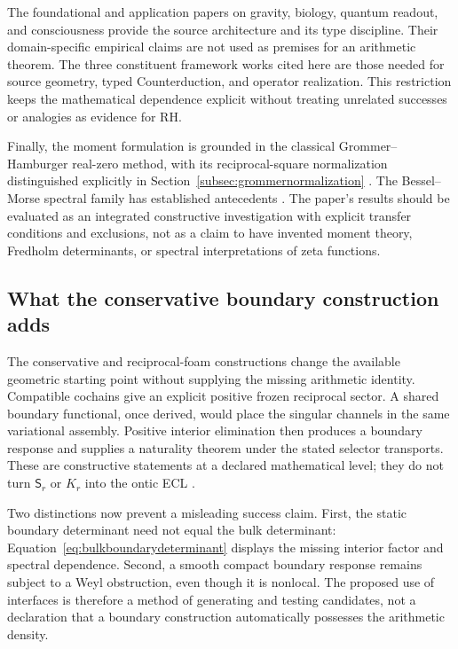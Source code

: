 \documentclass[11pt,letterpaper]{article}
\numberwithin{equation}{section}
\theoremstyle{definition}
\theoremstyle{remark}
\begin{document}
The foundational and application papers on gravity, biology, quantum readout, and consciousness provide the source architecture and its type discipline. Their domain-specific empirical claims are not used as premises for an arithmetic theorem. The three constituent framework works cited here are those needed for source geometry, typed Counterduction, and operator realization. This restriction keeps the mathematical dependence explicit without treating unrelated successes or analogies as evidence for RH.

Finally, the moment formulation is grounded in the classical Grommer--Hamburger real-zero method, with its reciprocal-square normalization distinguished explicitly in Section~\ref{subsec:grommernormalization} \cite{grommer,schmudgen,bariczstampach}. The Bessel--Morse spectral family has established antecedents \cite{lagarias}. The paper's results should be evaluated as an integrated constructive investigation with explicit transfer conditions and exclusions, not as a claim to have invented moment theory, Fredholm determinants, or spectral interpretations of zeta functions.

\subsection{What the conservative boundary construction adds}
\label{subsec:discussionboundary}
The conservative and reciprocal-foam constructions change the available geometric starting point without supplying the missing arithmetic identity. Compatible cochains give an explicit positive frozen reciprocal sector. A shared boundary functional, once derived, would place the singular channels in the same variational assembly. Positive interior elimination then produces a boundary response and supplies a naturality theorem under the stated selector transports. These are constructive statements at a declared mathematical level; they do not turn $\mathsf S_r$ or $K_r$ into the ontic ECL \cite{tcgsconservative,tcgsfoam}.

Two distinctions now prevent a misleading success claim. First, the static boundary determinant need not equal the bulk determinant: Equation~\eqref{eq:bulkboundarydeterminant} displays the missing interior factor and spectral dependence. Second, a smooth compact boundary response remains subject to a Weyl obstruction, even though it is nonlocal. The proposed use of interfaces is therefore a method of generating and testing candidates, not a declaration that a boundary construction automatically possesses the arithmetic density.
\end{document}

